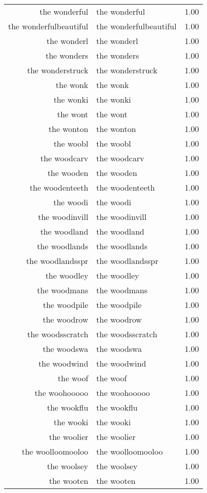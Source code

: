 \begin{table}[ht]
\begin{tabular}{rlr}
  the wonderful & the wonderful & 1.00 \\ 
  the wonderfulbeautiful & the wonderfulbeautiful & 1.00 \\ 
  the wonderl & the wonderl & 1.00 \\ 
  the wonders & the wonders & 1.00 \\ 
  the wonderstruck & the wonderstruck & 1.00 \\ 
  the wonk & the wonk & 1.00 \\ 
  the wonki & the wonki & 1.00 \\ 
  the wont & the wont & 1.00 \\ 
  the wonton & the wonton & 1.00 \\ 
  the woobl & the woobl & 1.00 \\ 
  the woodcarv & the woodcarv & 1.00 \\ 
  the wooden & the wooden & 1.00 \\ 
  the woodenteeth & the woodenteeth & 1.00 \\ 
  the woodi & the woodi & 1.00 \\ 
  the woodinvill & the woodinvill & 1.00 \\ 
  the woodland & the woodland & 1.00 \\ 
  the woodlands & the woodlands & 1.00 \\ 
  the woodlandsspr & the woodlandsspr & 1.00 \\ 
  the woodley & the woodley & 1.00 \\ 
  the woodmans & the woodmans & 1.00 \\ 
  the woodpile & the woodpile & 1.00 \\ 
  the woodrow & the woodrow & 1.00 \\ 
  the woodsscratch & the woodsscratch & 1.00 \\ 
  the woodswa & the woodswa & 1.00 \\ 
  the woodwind & the woodwind & 1.00 \\ 
  the woof & the woof & 1.00 \\ 
  the woohooooo & the woohooooo & 1.00 \\ 
  the wookflu & the wookflu & 1.00 \\ 
  the wooki & the wooki & 1.00 \\ 
  the woolier & the woolier & 1.00 \\ 
  the woolloomooloo & the woolloomooloo & 1.00 \\ 
  the woolsey & the woolsey & 1.00 \\ 
  the wooten & the wooten & 1.00 \\ 

\end{tabular}
\end{table}
